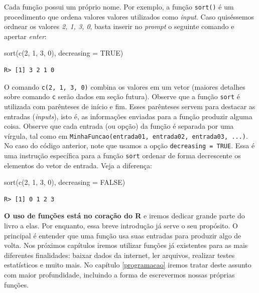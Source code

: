 \documentclass[
  11pt,
]{book}
\newenvironment{Shaded}{\begin{snugshade}}{\end{snugshade}}
\newcommand{\AttributeTok}[1]{\textcolor[rgb]{0.61,0.61,0.61}{#1}}
\newcommand{\ConstantTok}[1]{\textcolor[rgb]{0,0,0}{#1}}
\newcommand{\DecValTok}[1]{\textcolor[rgb]{0.06,0.06,0.06}{#1}}
\newcommand{\FunctionTok}[1]{\textcolor[rgb]{0,0,0}{#1}}
\newcommand{\NormalTok}[1]{#1}
\begin{document}
Cada função possui um próprio nome. Por exemplo, a função \texttt{sort()} é um procedimento que ordena valores valores utilizados como \emph{input}. Caso quiséssemos ordnear os valores \emph{2, 1, 3, 0}, basta inserir no \emph{prompt} o seguinte comando e apertar \emph{enter}:

\begin{Shaded}
\begin{Highlighting}[]
\FunctionTok{sort}\NormalTok{(}\FunctionTok{c}\NormalTok{(}\DecValTok{2}\NormalTok{, }\DecValTok{1}\NormalTok{, }\DecValTok{3}\NormalTok{, }\DecValTok{0}\NormalTok{), }\AttributeTok{decreasing =} \ConstantTok{TRUE}\NormalTok{)}
\end{Highlighting}
\end{Shaded}

\begin{verbatim}
R> [1] 3 2 1 0
\end{verbatim}

O comando \texttt{c(2,\ 1,\ 3,\ 0)} combina os valores em um vetor (maiores detalhes sobre comando \texttt{c} serão dados em seção futura). Observe que a função \texttt{sort} é utilizada com parênteses de início e fim. Esses parênteses servem para destacar as entradas (\emph{inputs}), isto é, as informações enviadas para a função produzir alguma coisa. Observe que cada entrada (ou opção) da função é separada por uma vírgula, tal como em \texttt{MinhaFuncao(entrada01,\ entrada02,\ entrada03,\ ...)}. No caso do código anterior, note que usamos a opção \texttt{decreasing\ =\ TRUE}. Essa é uma instrução específica para a função \texttt{sort} ordenar de forma decrescente os elementos do vetor de entrada. Veja a diferença:

\begin{Shaded}
\begin{Highlighting}[]
\FunctionTok{sort}\NormalTok{(}\FunctionTok{c}\NormalTok{(}\DecValTok{2}\NormalTok{, }\DecValTok{1}\NormalTok{, }\DecValTok{3}\NormalTok{, }\DecValTok{0}\NormalTok{), }\AttributeTok{decreasing =} \ConstantTok{FALSE}\NormalTok{)}
\end{Highlighting}
\end{Shaded}

\begin{verbatim}
R> [1] 0 1 2 3
\end{verbatim}

\textbf{O uso de funções está no coração do R} e iremos dedicar grande parte do livro a elas. Por enquanto, essa breve introdução já serve o seu propósito. O principal é entender que uma função usa suas entradas para produzir algo de volta. Nos próximos capítulos iremos utilizar funções já existentes para as mais diferentes finalidades: baixar dados da internet, ler arquivos, realizar testes estatísticos e muito mais. No capítulo \ref{programacao} iremos tratar deste assunto com maior profundidade, incluindo a forma de escrevermos nossas próprias funções.
\end{document}
